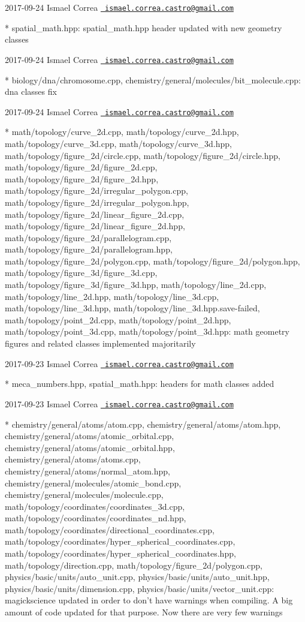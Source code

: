  2017-\/09-\/24 Ismael Correa \href{mailto:ismael.correa.castro@gmail.com}{\texttt{ ismael.\+correa.\+castro@gmail.\+com}} \begin{DoxyVerb}* spatial_math.hpp: spatial_math.hpp header updated with new
geometry classes
\end{DoxyVerb}
 2017-\/09-\/24 Ismael Correa \href{mailto:ismael.correa.castro@gmail.com}{\texttt{ ismael.\+correa.\+castro@gmail.\+com}} \begin{DoxyVerb}* biology/dna/chromosome.cpp,
chemistry/general/molecules/bit_molecule.cpp: dna classes fix
\end{DoxyVerb}
 2017-\/09-\/24 Ismael Correa \href{mailto:ismael.correa.castro@gmail.com}{\texttt{ ismael.\+correa.\+castro@gmail.\+com}} \begin{DoxyVerb}* math/topology/curve_2d.cpp, math/topology/curve_2d.hpp,
math/topology/curve_3d.cpp, math/topology/curve_3d.hpp,
math/topology/figure_2d/circle.cpp,
math/topology/figure_2d/circle.hpp,
math/topology/figure_2d/figure_2d.cpp,
math/topology/figure_2d/figure_2d.hpp,
math/topology/figure_2d/irregular_polygon.cpp,
math/topology/figure_2d/irregular_polygon.hpp,
math/topology/figure_2d/linear_figure_2d.cpp,
math/topology/figure_2d/linear_figure_2d.hpp,
math/topology/figure_2d/parallelogram.cpp,
math/topology/figure_2d/parallelogram.hpp,
math/topology/figure_2d/polygon.cpp,
math/topology/figure_2d/polygon.hpp,
math/topology/figure_3d/figure_3d.cpp,
math/topology/figure_3d/figure_3d.hpp, math/topology/line_2d.cpp,
math/topology/line_2d.hpp, math/topology/line_3d.cpp,
math/topology/line_3d.hpp, math/topology/line_3d.hpp.save-failed,
math/topology/point_2d.cpp, math/topology/point_2d.hpp,
math/topology/point_3d.cpp, math/topology/point_3d.hpp: math
geometry figures and related classes implemented majoritarily
\end{DoxyVerb}
 2017-\/09-\/23 Ismael Correa \href{mailto:ismael.correa.castro@gmail.com}{\texttt{ ismael.\+correa.\+castro@gmail.\+com}} \begin{DoxyVerb}* meca_numbers.hpp, spatial_math.hpp: headers for math classes added
\end{DoxyVerb}
 2017-\/09-\/23 Ismael Correa \href{mailto:ismael.correa.castro@gmail.com}{\texttt{ ismael.\+correa.\+castro@gmail.\+com}} \begin{DoxyVerb}* chemistry/general/atoms/atom.cpp,
chemistry/general/atoms/atom.hpp,
chemistry/general/atoms/atomic_orbital.cpp,
chemistry/general/atoms/atomic_orbital.hpp,
chemistry/general/atoms/atoms.cpp,
chemistry/general/atoms/normal_atom.hpp,
chemistry/general/molecules/atomic_bond.cpp,
chemistry/general/molecules/molecule.cpp,
math/topology/coordinates/coordinates_3d.cpp,
math/topology/coordinates/coordinates_nd.hpp,
math/topology/coordinates/directional_coordinates.cpp,
math/topology/coordinates/hyper_spherical_coordinates.cpp,
math/topology/coordinates/hyper_spherical_coordinates.hpp,
math/topology/direction.cpp, math/topology/figure_2d/polygon.cpp,
physics/basic/units/auto_unit.cpp,
physics/basic/units/auto_unit.hpp,
physics/basic/units/dimension.cpp,
physics/basic/units/vector_unit.cpp: magickscience updated in order
to don't have warnings when compiling. A big amount of code updated
for that purpose. Now there are very few warnings
\end{DoxyVerb}
